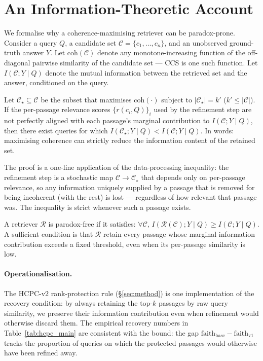 \section{An Information-Theoretic Account}
\label{sec:theory}

We formalise why a coherence-maximising retriever can be paradox-prone.
Consider a query $Q$, a candidate set $\mathcal{C} = \{c_1, \ldots,
c_n\}$, and an unobserved ground-truth answer $Y$. Let
$\textrm{coh}(\mathcal{C})$ denote any monotone-increasing function of
the off-diagonal pairwise similarity of the candidate set --- CCS is
one such function. Let $I(\mathcal{C}; Y \mid Q)$ denote the mutual
information between the retrieved set and the answer, conditioned on
the query.

\begin{proposition}
\label{prop:paradox}
Let $\mathcal{C}_\star \subseteq \mathcal{C}$ be the subset that
maximises $\textrm{coh}(\cdot)$ subject to $|\mathcal{C}_\star| = k'$
($k' \leq |\mathcal{C}|$). If the per-passage relevance scores
$\{r(c_i, Q)\}_i$ used by the refinement step are not perfectly aligned
with each passage's marginal contribution to $I(\mathcal{C}; Y \mid Q)$,
then there exist queries for which
$I(\mathcal{C}_\star; Y \mid Q) < I(\mathcal{C}; Y \mid Q)$. In words:
maximising coherence can strictly reduce the information content of
the retained set.
\end{proposition}

The proof is a one-line application of the data-processing inequality:
the refinement step is a stochastic map $\mathcal{C} \to
\mathcal{C}_\star$ that depends only on per-passage relevance, so any
information uniquely supplied by a passage that is removed for being
incoherent (with the rest) is lost --- regardless of how relevant that
passage was. The inequality is strict whenever such a passage exists.

\begin{theorem}
\label{thm:paradox_free}
A retriever $\mathcal{R}$ is paradox-free if it satisfies:
$\forall \mathcal{C}, \, I(\mathcal{R}(\mathcal{C}); Y \mid Q) \geq
I(\mathcal{C}; Y \mid Q)$. A sufficient condition is that
$\mathcal{R}$ retain every passage whose marginal information
contribution exceeds a fixed threshold, even when its per-passage
similarity is low.
\end{theorem}

\paragraph{Operationalisation.}
The HCPC-v$2$ rank-protection rule (\S\ref{sec:method}) is one
implementation of the recovery condition: by always retaining the
top-$k$ passages by raw query similarity, we preserve their
information contribution even when refinement would otherwise discard
them. The empirical recovery numbers in
Table~\ref{tab:hcpc_main} are consistent with the bound: the gap
$\textrm{faith}_{\textrm{base}} - \textrm{faith}_{\textrm{v1}}$ tracks
the proportion of queries on which the protected passages would
otherwise have been refined away.

